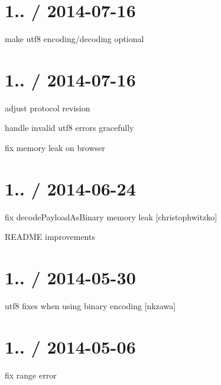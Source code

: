 \section*{1.. / 2014-\/07-\/16 }


\begin{DoxyItemize}
\item make utf8 encoding/decoding optional
\end{DoxyItemize}

\section*{1.. / 2014-\/07-\/16 }


\begin{DoxyItemize}
\item adjust protocol revision
\item handle invalid utf8 errors gracefully
\item fix memory leak on browser
\end{DoxyItemize}

\section*{1.. / 2014-\/06-\/24 }


\begin{DoxyItemize}
\item fix decode\+Payload\+As\+Binary memory leak \mbox{[}christophwitzko\mbox{]}
\item R\+E\+A\+D\+ME improvements
\end{DoxyItemize}

\section*{1.. / 2014-\/05-\/30 }


\begin{DoxyItemize}
\item utf8 fixes when using binary encoding \mbox{[}nkzawa\mbox{]}
\end{DoxyItemize}

\section*{1.. / 2014-\/05-\/06 }


\begin{DoxyItemize}
\item fix range error
\end{DoxyItemize}

